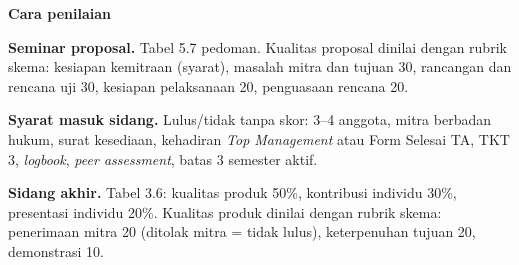 \textbf{Cara penilaian}

\textbf{Seminar proposal.} Tabel 5.7 pedoman. Kualitas proposal dinilai dengan rubrik skema: kesiapan kemitraan (syarat), masalah mitra dan tujuan 30, rancangan dan rencana uji 30, kesiapan pelaksanaan 20, penguasaan rencana 20.

\textbf{Syarat masuk sidang.} Lulus/tidak tanpa skor: 3--4 anggota, mitra berbadan hukum, surat kesediaan, kehadiran \textit{Top Management} atau Form Selesai TA, TKT 3, \textit{logbook}, \textit{peer assessment}, batas 3 semester aktif.

\textbf{Sidang akhir.} Tabel 3.6: kualitas produk 50\%, kontribusi individu 30\%, presentasi individu 20\%. Kualitas produk dinilai dengan rubrik skema: penerimaan mitra 20 (ditolak mitra = tidak lulus), keterpenuhan tujuan 20, demonstrasi 10.
\clearpage
